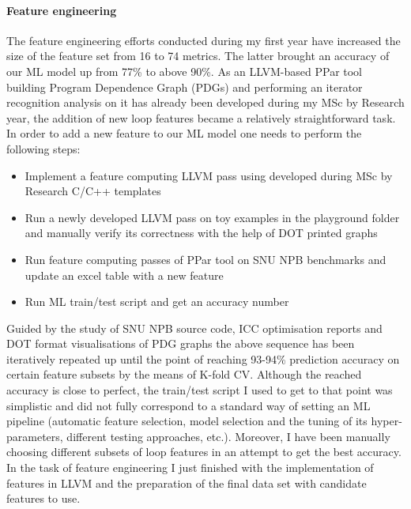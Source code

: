 \documentclass[10pt,a4paper]{report}
\begin{document}
\paragraph{Feature engineering}
The feature engineering efforts conducted during my first year have increased the size of the feature set from 16 to 74 metrics. The latter brought an accuracy of our ML model up from 77\% to above 90\%. As an LLVM-based PPar tool \cite{github-ppar-tool} building Program Dependence Graph (PDGs) \cite{Ferrante:1987:PDG:24039.24041} and performing an iterator recognition analysis \cite{Manilov:2018:GPI:3178372.3179511} on it has already been developed during my MSc by Research year, the addition of new loop features became a relatively straightforward task. In order to add a new feature to our ML model one needs to perform the following steps: 
\begin{itemize}
\renewcommand\labelitemi{$\bullet$}
\item Implement a feature computing LLVM pass using developed during MSc by Research C/C++ templates \cite{github-ppar-tool}
\item Run a newly developed LLVM pass on toy examples in the playground folder and manually verify its correctness with the help of DOT printed graphs 
\item Run feature computing passes of PPar tool on SNU NPB benchmarks and update an excel table with a new feature
\item Run ML train/test script and get an accuracy number
\end{itemize}
Guided by the study of SNU NPB source code, ICC optimisation reports and DOT format visualisations of PDG graphs the above sequence has been iteratively repeated up until the point of reaching 93-94\% prediction accuracy on certain feature subsets by the means of K-fold CV. Although the reached accuracy is close to perfect, the train/test script I used to get to that point was simplistic and did not fully correspond to a standard way of setting an ML pipeline (automatic feature selection, model selection and the tuning of its hyper-parameters, different testing approaches, etc.). Moreover, I have been manually choosing different subsets of loop features in an attempt to get the best accuracy. In the task of feature engineering I just finished with the implementation of features in LLVM and the preparation of the final data set with candidate features to use.
\end{document}
